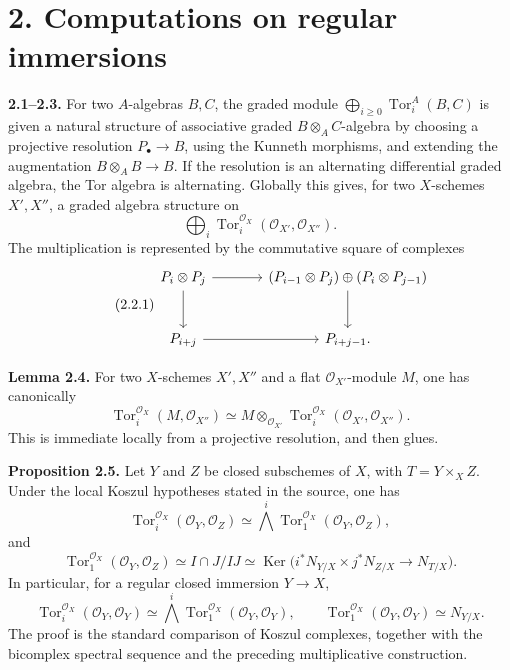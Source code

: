 \documentclass[11pt]{article}
\newcommand{\Tor}{\operatorname{Tor}}
\providecommand{\Tor}{\operatorname{Tor}}
\providecommand{\Ker}{\operatorname{Ker}}
\providecommand{\cO}{\mathcal O}
\begin{document}
\section*{2. Computations on regular immersions}

\textbf{2.1--2.3.} For two \(A\)-algebras \(B,C\), the graded module \(\bigoplus_{i\ge0}\Tor_i^A(B,C)\) is given a natural structure of associative graded \(B\otimes_A C\)-algebra by choosing a projective resolution \(P_\bullet\to B\), using the Kunneth morphisms, and extending the augmentation \(B\otimes_A B\to B\). If the resolution is an alternating differential graded algebra, the Tor algebra is alternating. Globally this gives, for two \(X\)-schemes \(X',X''\), a graded algebra structure on
\[
\bigoplus_i\Tor_i^{\cO_X}(\cO_{X'},\cO_{X''}).
\]
The multiplication is represented by the commutative square of complexes
\begin{equation}\tag{2.2.1}
\begin{tikzcd}[column sep=large,row sep=large]
P_i\otimes P_j \arrow[r] \arrow[d] & (P_{i-1}\otimes P_j)\oplus(P_i\otimes P_{j-1}) \arrow[d]\\
P_{i+j} \arrow[r] & P_{i+j-1}.
\end{tikzcd}
\end{equation}

\textbf{Lemma 2.4.} For two \(X\)-schemes \(X',X''\) and a flat \(\cO_{X'}\)-module \(M\), one has canonically
\begin{equation}\tag{2.4.1}
\Tor_i^{\cO_X}(M,\cO_{X''})\simeq
M\otimes_{\cO_{X'}}\Tor_i^{\cO_X}(\cO_{X'},\cO_{X''}).
\end{equation}
This is immediate locally from a projective resolution, and then glues.

\textbf{Proposition 2.5.} Let \(Y\) and \(Z\) be closed subschemes of \(X\), with \(T=Y\times_XZ\). Under the local Koszul hypotheses stated in the source, one has
\begin{equation}\tag{2.5.1}
\Tor_i^{\cO_X}(\cO_Y,\cO_Z)\simeq \bigwedge^i\Tor_1^{\cO_X}(\cO_Y,\cO_Z),
\end{equation}
and
\begin{equation}\tag{2.5.2}
\Tor_1^{\cO_X}(\cO_Y,\cO_Z)
\simeq I\cap J/IJ
\simeq \Ker\bigl(i^*N_{Y/X}\times j^*N_{Z/X}\to N_{T/X}\bigr).
\end{equation}
In particular, for a regular closed immersion \(Y\to X\),
\begin{equation}\tag{2.5.3}
\Tor_i^{\cO_X}(\cO_Y,\cO_Y)\simeq
\bigwedge^i\Tor_1^{\cO_X}(\cO_Y,\cO_Y),
\qquad
\Tor_1^{\cO_X}(\cO_Y,\cO_Y)\simeq N_{Y/X}.
\end{equation}
The proof is the standard comparison of Koszul complexes, together with the bicomplex spectral sequence and the preceding multiplicative construction.
\end{document}
